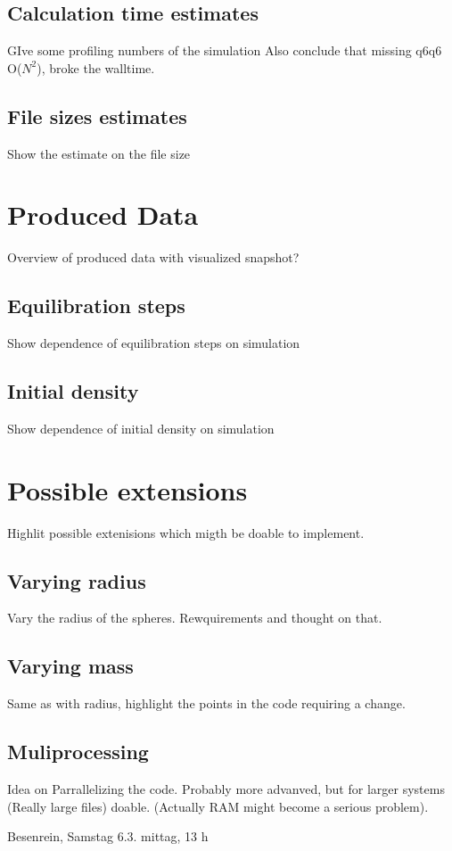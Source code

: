 \subsection{Calculation time estimates}
\label{sec:calc_times}
GIve some profiling numbers of the simulation
Also conclude that missing q6q6 O($N^2$), broke the walltime.

\subsection{File sizes estimates}
\label{sec:file_size}
Show the estimate on the file size

\section{Produced Data}
\label{sec:data}
Overview of produced data with visualized snapshot?

\subsection{Equilibration steps}
\label{sec:eq_steps}
Show dependence of equilibration steps on simulation

\subsection{Initial density}
\label{sec:}
Show dependence of initial density on simulation

\section{Possible extensions}
\label{sec:simulation_ext}
Highlit possible extenisions which migth be doable to implement.

\subsection{Varying radius}
\label{sec:extension_radius}
Vary the radius of the spheres. Rewquirements and thought on that.

\subsection{Varying mass}
\label{sec:extension_mass}
Same as with radius, highlight the points in the code requiring a change.

\subsection{Muliprocessing}
\label{sec:extension_MP}
Idea on Parrallelizing the code. Probably more advanved, but for larger systems (Really large files) doable. (Actually RAM might become a serious problem).

Besenrein, Samstag 6.3.  mittag, 13 h 


